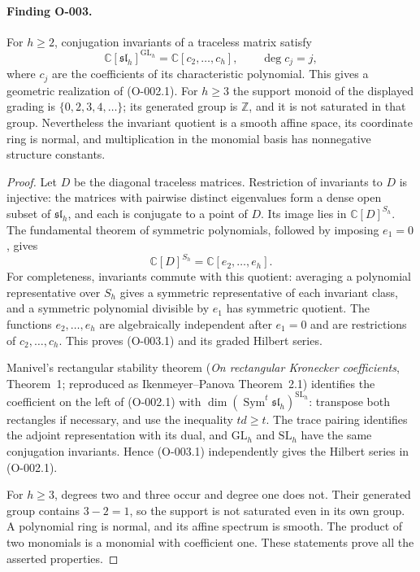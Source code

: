 \paragraph{Finding O-003.}
For $h\geq2$, conjugation invariants of a traceless matrix satisfy
\[
 \mathbb C[\mathfrak{sl}_h]^{\mathrm{GL}_h}
       =\mathbb C[c_2,\ldots,c_h],\qquad \deg c_j=j,       \tag{O-003.1}
\]
where $c_j$ are the coefficients of its characteristic polynomial.
This gives a geometric realization of (O-002.1). For $h\geq3$ the
support monoid of the displayed grading is
$\{0,2,3,4,\ldots\}$; its generated group is $\mathbb Z$, and it is
not saturated in that group.  Nevertheless the invariant quotient is a
smooth affine space, its coordinate ring is normal, and multiplication
in the monomial basis has nonnegative structure constants.

\begin{proof}
Let $D$ be the diagonal traceless matrices.  Restriction of invariants to
$D$ is injective: the matrices with pairwise distinct eigenvalues form a
dense open subset of $\mathfrak{sl}_h$, and each is conjugate to a point
of $D$.  Its image lies in $\mathbb C[D]^{S_h}$.
The fundamental theorem of symmetric polynomials, followed by imposing
$e_1=0$, gives
\[
 \mathbb C[D]^{S_h}=\mathbb C[e_2,\ldots,e_h].
\]
For completeness, invariants commute with this quotient: averaging a
polynomial representative over $S_h$ gives a symmetric representative
of each invariant class, and a symmetric polynomial divisible by $e_1$
has symmetric quotient. The functions $e_2,\ldots,e_h$ are algebraically
independent after $e_1=0$ and are restrictions of $c_2,\ldots,c_h$.
This proves (O-003.1) and its graded Hilbert series.

Manivel's rectangular stability theorem (\emph{On rectangular Kronecker
coefficients}, Theorem~1; reproduced as Ikenmeyer--Panova Theorem~2.1)
identifies the coefficient on the left of (O-002.1) with
$\dim(\operatorname{Sym}^t\mathfrak{sl}_h)^{\mathrm{SL}_h}$: transpose
both rectangles if necessary, and use the inequality $td\geq t$.
The trace pairing identifies the adjoint representation with its dual,
and $\mathrm{GL}_h$ and $\mathrm{SL}_h$ have the same conjugation
invariants.  Hence (O-003.1) independently gives the Hilbert series in
(O-002.1).

For $h\geq3$, degrees two and three occur and degree one does not.
Their generated group contains $3-2=1$, so the support is not saturated
even in its own group. A polynomial ring is normal, and its affine
spectrum is smooth. The product of two monomials is a monomial with
coefficient one. These statements prove all the asserted properties.
\end{proof}

